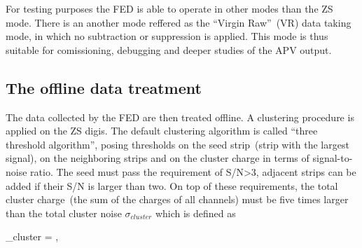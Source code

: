 For testing purposes the FED is able to operate in other modes than the ZS mode. There is an another mode reffered as the ``Virgin Raw''~(VR) data taking mode, in which no subtraction or suppression is applied. This mode is thus suitable for comissioning, debugging and deeper studies of the APV output.





\subsection{The offline data treatment}


The data collected by the FED are then treated offline. A clustering procedure is applied on the ZS digis. The default clustering algorithm is called ``three threshold algorithm'', posing thresholds on the seed strip~(strip with the largest signal), on the neighboring strips and on the cluster charge in terms of signal-to-noise ratio. The seed must pass the requirement of S/N>3, adjacent strips can be added if their S/N is larger than two. On top of these requirements, the total cluster charge~(the sum of the charges of all channels) must be five times larger than the total cluster noise $\sigma_{cluster}$ which is defined as


{
    \sigma_{cluster} = ,
}

